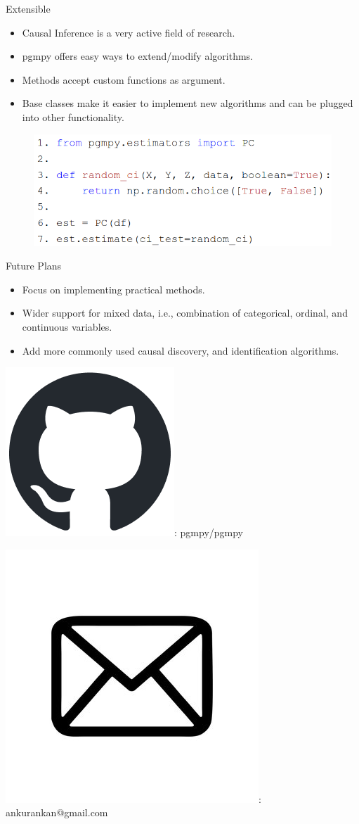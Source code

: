 \documentclass{beamer}
\newcommand\github{\includegraphics[height=2ex]{imgs/github.png}}
\newcommand\email{\includegraphics[height=3ex]{imgs/email.png}}
\begin{document}
\begin{frame}{Extensible}
	\begin{itemize}
		\item Causal Inference is a very active field of research.
		\item pgmpy offers easy ways to extend/modify algorithms.
		\item Methods accept custom functions as argument.
		\item Base classes make it easier to implement new algorithms and can be plugged into other functionality.
	\end{itemize}
	\vspace{1em}
	\begin{figure}
		\centering
		\includegraphics[scale=0.3]{imgs/extend.png}
	\end{figure}
\end{frame}

\begin{frame}{Future Plans}
	\begin{itemize}
		\item Focus on implementing practical methods.
		\item Wider support for mixed data, i.e., combination of categorical, ordinal, and continuous variables.
		\item Add more commonly used causal discovery, and identification algorithms.
	\end{itemize}
\end{frame}

\begin{frame}
	\vspace{5em}

	\github : pgmpy/pgmpy
	\vspace{1em}

	\email : ankurankan@gmail.com
\end{frame}

% 
\end{document}
